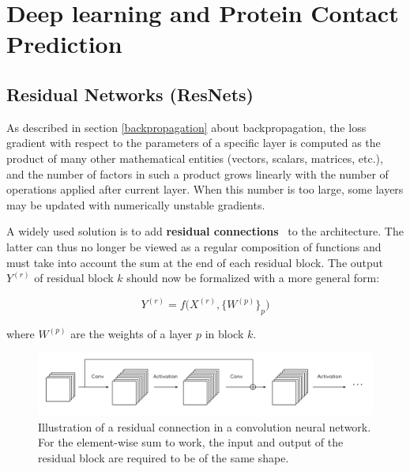 \section{Deep learning and Protein Contact Prediction}

    \subsection{Residual Networks (ResNets)}

        As described in section \ref{backpropagation} about backpropagation,
        the loss gradient with respect to the parameters of a specific layer
        is computed as the product of many other mathematical entities
        (vectors, scalars, matrices, etc.), and the number of factors in such
        a product grows linearly with the number of operations applied after
        current layer. When this number is too large, some layers may be
        updated with numerically unstable gradients.

        A widely used solution is to add
        \textbf{residual connections}~\cite{DBLP:journals/corr/HeZRS15}
        to the architecture. The latter can thus no longer be viewed as
        a regular composition of functions and must take into account
        the sum at the end of each residual block.
        The output $Y^{(r)}$ of residual block $k$ should now
        be formalized with a more general form:

        \begin{equation}
            Y^{(r)} = f\big(X^{(r)}, \{W^{(p)}\}_p\big)
        \end{equation}

        where $W^{(p)}$ are the weights of a layer $p$ in block $k$.

        \begin{figure}[H]
            \begin{center}
                \includegraphics[width=\textwidth, keepaspectratio]{imgs/resnet.png}
                \caption{Illustration of a residual connection in a convolution
                neural network. For the element-wise sum to work, the input and output
                of the residual block are required to be of the same shape.}
                \label{resnet}
            \end{center}
        \end{figure}
    
